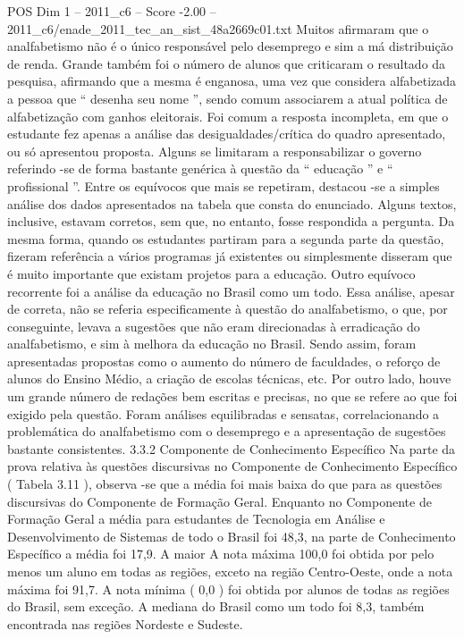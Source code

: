 \begin{textsample}{POS Dim 1 – 2011\_c6 – Score -2.00 – 2011\_c6/enade\_2011\_tec\_an\_sist\_48a2669c01.txt}
Muitos afirmaram que o analfabetismo não é o único responsável pelo desemprego e sim a má distribuição de renda.
Grande também foi o número de alunos que criticaram o resultado da pesquisa, afirmando que a mesma é enganosa, uma vez que considera alfabetizada a pessoa que “ desenha seu nome ”, sendo comum associarem a atual política de alfabetização com ganhos eleitorais.
Foi comum a resposta incompleta, em que o estudante fez apenas a análise das desigualdades/crítica do quadro apresentado, ou só apresentou proposta.
Alguns se limitaram a responsabilizar o governo referindo -se de forma bastante genérica à questão da “ educação ” e “ profissional ”.
Entre os equívocos que mais se repetiram, destacou -se a simples análise dos dados apresentados na tabela que consta do enunciado.
Alguns textos, inclusive, estavam corretos, sem que, no entanto, fosse respondida a pergunta.
Da mesma forma, quando os estudantes partiram para a segunda parte da questão, fizeram referência a vários programas já existentes ou simplesmente disseram que é muito importante que existam projetos para a educação.
Outro equívoco recorrente foi a análise da educação no Brasil como um todo.
Essa análise, apesar de correta, não se referia especificamente à questão do analfabetismo, o que, por conseguinte, levava a sugestões que não eram direcionadas à erradicação do analfabetismo, e sim à melhora da educação no Brasil.
Sendo assim, foram apresentadas propostas como o aumento do número de faculdades, o reforço de alunos do Ensino Médio, a criação de escolas técnicas, etc.
Por outro lado, houve um grande número de redações bem escritas e precisas, no que se refere ao que foi exigido pela questão.
Foram análises equilibradas e sensatas, correlacionando a problemática do analfabetismo com o desemprego e a apresentação de sugestões bastante consistentes. 3.3.2 Componente de Conhecimento Específico Na parte da prova relativa às questões discursivas no Componente de Conhecimento Específico ( Tabela 3.11 ), observa -se que a média foi mais baixa do que para as questões discursivas do Componente de Formação Geral.
Enquanto no Componente de Formação Geral a média para estudantes de Tecnologia em Análise e Desenvolvimento de Sistemas de todo o Brasil foi 48,3, na parte de Conhecimento Específico a média foi 17,9.
A maior A nota máxima 100,0 foi obtida por pelo menos um aluno em todas as regiões, exceto na região Centro-Oeste, onde a nota máxima foi 91,7.
A nota mínima ( 0,0 ) foi obtida por alunos de todas as regiões do Brasil, sem exceção.
A mediana do Brasil como um todo foi 8,3, também encontrada nas regiões Nordeste e Sudeste.

\end{textsample}
